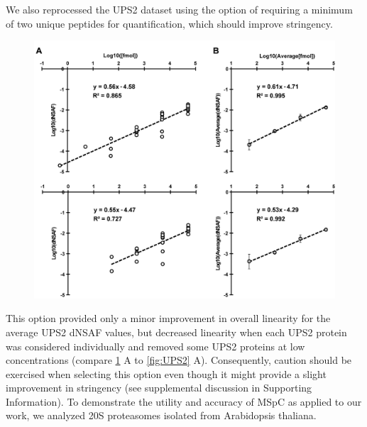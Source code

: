 We also reprocessed the UPS2 dataset using the option of requiring a minimum of two unique peptides for quantification, which should improve stringency.
\begin{figure}[p]
	\centering
	\includegraphics[width=\columnwidth]{MSpC/figure2_supplemental.png}
	\label{fig:UPS2twopep}
\end{figure}
This option provided only a minor improvement in overall linearity for the average UPS2 dNSAF values, but decreased linearity when each UPS2 protein was considered individually and removed some UPS2 proteins at low concentrations (compare \ref{fig:UPS2twopep} A to \ref{fig:UPS2} A).
Consequently, caution should be exercised when selecting this option even though it might provide a slight improvement in stringency (see supplemental discussion in Supporting Information).
To demonstrate the utility and accuracy of MSpC as applied to our work, we analyzed 20S proteasomes isolated from Arabidopsis thaliana.
